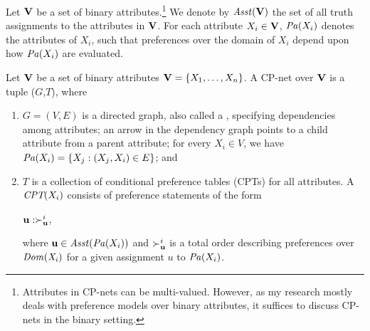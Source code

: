 Let $\textbf{V}$ be a set of binary attributes.\footnote{
	Attributes in CP-nets can be multi-valued. However,
	as my research mostly deals with preference models over
	binary attributes, it suffices to discuss CP-nets
	in the binary setting.
}
We denote by $\mathit{Asst}(\textbf{V})$ the set of
all truth assignments to the attributes in $\textbf{V}$.
For each attribute $X_i \in \textbf{V}$, $\mathit{Pa}(X_i)$ denotes the  attributes of
$X_i$, such that preferences over the domain of $X_i$ depend upon how
$\mathit{Pa}(X_i)$ are evaluated.
%
%

\begin{definition}
\label{def:cpn}
	Let $\textbf{V}$ be a set of binary attributes $\textbf{V}=\{X_1,\ldots,X_n\}$.
	A CP-net over $\textbf{V}$ is a tuple ($G$,$T$), where
	\begin{enumerate} \itemsep -4pt
		\item $G=(V,E)$ is a directed graph, also called a
					, specifying
					dependencies among attributes;
					an arrow in the dependency graph points
					to a child attribute from a parent attribute;
					for every $X_i \in V$, we have
					$\mathit{Pa}(X_i)=\{X_j:(X_j,X_i) \in E\}$; and
		\item $T$ is a collection of 
					conditional preference tables (CPTs) for
					all attributes.  A $\textit{CPT}(X_i)$ consists of preference
					statements of the form
					\begin{center}
						$\textbf{u} : \succ^i_{\textbf{u}}$,
					\end{center}
					where $\textbf{u} \in \mathit{Asst}(\mathit{Pa}(X_i))$ and $\succ^i_{\textbf{u}}$
					is a total order describing preferences over 
					$\it{Dom}(X_i)$ for a given assignment $u$ to $\mathit{Pa}(X_i)$.
	\end{enumerate}
\end{definition}

